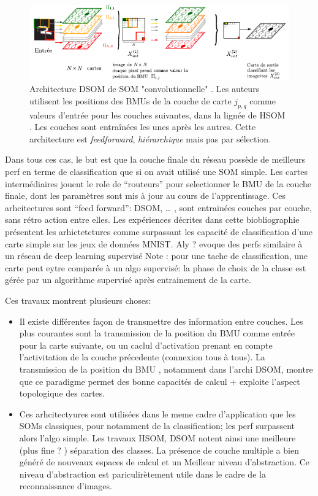 \documentclass[../main]{subfiles}
\begin{document}
\begin{figure}
    \includegraphics[width=\textwidth]{DSOM.pdf}
    \caption{Architecture DSOM de SOM "convolutionnelle" \cite{liu_deep_2015}. Les auteurs utilisent les positions des BMUs de la couche de carte $j_{p,q}$ comme valeurs d'entrée pour les couches suivantes, dans la lignée de HSOM \cite{lampinen_clustering_1992}. Les couches sont entraînées les unes après les autres. Cette architecture est \emph{feedforward}, \emph{hiérarchique} mais pas par sélection. \label{fig:dsom}}
\end{figure}

Dans tous ces cas, le but est que la couche finale du réseau possède de meilleurs perf en terme de classification que si on avait utilisé une SOM simple. Les cartes intermédiaires jouent le role de “routeurs” pour selectionner le BMU de la couche finale,  dont les paramètres sont mis à jour au cours de l'apprentissage.
Ces arhcitectures sont “feed forward”: DSOM, … , sont entrainées couches par couche, sans rétro action entre elles. 
Les expériences décrites dans cette biobliographie présentent les arhictetctures comme surpassant les capacité de classification d'une carte simple sur les jeux de données MNIST.
Aly ? evoque des perfs similaire à un réseau de deep learning supervisé
Note : pour une tache de classification, une carte peut eytre comparée à un algo supervisé: la phase de choix de la classe est gérée par un algorithme supervisé après entrainement de la carte.


Ces travaux montrent plusieurs choses:
\begin{itemize}
    \item Il existe différentes façon de transmettre des information entre couches. Les plus courantes sont la transmission de la position du BMU comme entrée pour la carte suivante, ou un caclul d'activation prenant en compte l'activitation de la couche précedente (connexion tous à tous).
    La transmission de la position du BMU , notamment dans l'archi DSOM, montre que ce paradigme permet des bonne capacités de calcul + exploite l'aspect topologique des cartes.
    \item Ces arhcitectyures sont utilisées dans le meme cadre d'application que les SOMs classiques, pour notamment de la classification; les perf surpassent alors l'algo simple. Les travaux HSOM, DSOM notent ainsi une meilleure (plus fine ? ) séparation des classes. La présence de couche multiple a bien généré de nouveaux espaces de calcul et un Meilleur niveau d'abstraction. Ce niveau d'abstraction est pariculirètement utile dans le cadre de la reconnaissance d'images.
\end{itemize}
\end{document}
